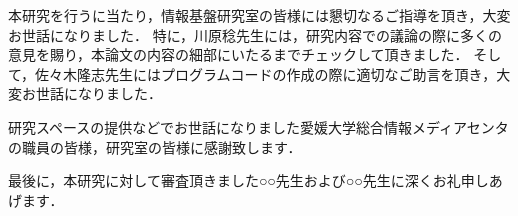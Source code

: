 \documentclass{thesis}
\begin{document}


\tableofcontents











\acknowledgement

本研究を行うに当たり，情報基盤研究室の皆様には懇切なるご指導を頂き，大変お世話になりました．
特に，川原稔先生には，研究内容での議論の際に多くの意見を賜り，本論文の内容の細部にいたるまでチェックして頂きました．
そして，佐々木隆志先生にはプログラムコードの作成の際に適切なご助言を頂き，大変お世話になりました．

研究スペースの提供などでお世話になりました愛媛大学総合情報メディアセンタの職員の皆様，研究室の皆様に感謝致します．

最後に，本研究に対して審査頂きました○○先生および○○先生に深くお礼申しあげます．

　
 
 
 \nocite{*}
% 
\end{document}
